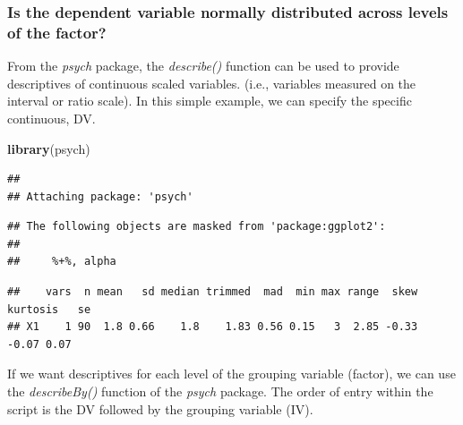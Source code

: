 \documentclass[
  english,
]{book}
\newenvironment{Shaded}{\begin{snugshade}}{\end{snugshade}}
\newcommand{\CommentTok}[1]{\textcolor[rgb]{0.56,0.35,0.01}{\textit{#1}}}
\newcommand{\KeywordTok}[1]{\textcolor[rgb]{0.13,0.29,0.53}{\textbf{#1}}}
\newcommand{\NormalTok}[1]{#1}
\newcommand{\OperatorTok}[1]{\textcolor[rgb]{0.81,0.36,0.00}{\textbf{#1}}}
\begin{document}
\hypertarget{is-the-dependent-variable-normally-distributed-across-levels-of-the-factor}{%
\subsubsection{Is the dependent variable normally distributed across levels of the factor?}\label{is-the-dependent-variable-normally-distributed-across-levels-of-the-factor}}

From the \emph{psych} package, the \emph{describe()} function can be used to provide descriptives of continuous scaled variables. (i.e., variables measured on the interval or ratio scale). In this simple example, we can specify the specific continuous, DV.

\begin{Shaded}
\begin{Highlighting}[]
\KeywordTok{library}\NormalTok{(psych)}
\end{Highlighting}
\end{Shaded}

\begin{verbatim}
## 
## Attaching package: 'psych'
\end{verbatim}

\begin{verbatim}
## The following objects are masked from 'package:ggplot2':
## 
##     %+%, alpha
\end{verbatim}

\begin{Shaded}
\end{Shaded}

\begin{verbatim}
##    vars  n mean   sd median trimmed  mad  min max range  skew kurtosis   se
## X1    1 90  1.8 0.66    1.8    1.83 0.56 0.15   3  2.85 -0.33    -0.07 0.07
\end{verbatim}

If we want descriptives for each level of the grouping variable (factor), we can use the \emph{describeBy()} function of the \emph{psych} package. The order of entry within the script is the DV followed by the grouping variable (IV).
\end{document}
